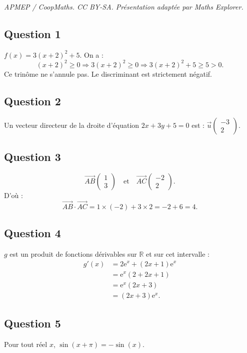 \documentclass[10pt]{article}
\providecommand{\e}{{\mathrm{e}}}
\begin{document}
\noindent\textit{APMEP / CoopMaths. CC BY-SA. Présentation adaptée par Maths Explorer.}\par\medskip
\subsection*{Question 1}

\(f(x) = 3(x + 2)^2 + 5\). On a :
\[
(x+2)^2 \geqslant 0 \Rightarrow 3(x+2)^2 \geqslant 0 \Rightarrow 3(x+2)^2 + 5 \geqslant 5 > 0.
\]
Ce trinôme ne s'annule pas. Le discriminant est strictement négatif.

\subsection*{Question 2}

Un vecteur directeur de la droite d'équation \(2x + 3y + 5 = 0\) est : \(\vec{u} \begin{pmatrix} -3 \\ 2 \end{pmatrix}\).

\subsection*{Question 3}

\[
\overrightarrow{AB} \begin{pmatrix} 1 \\ 3 \end{pmatrix} \quad \text{et} \quad \overrightarrow{AC} \begin{pmatrix} -2 \\ 2 \end{pmatrix}.
\]
D'où :
\[
\overrightarrow{AB} \cdot \overrightarrow{AC} = 1 \times (-2) + 3 \times 2 = -2 + 6 = 4.
\]

\subsection*{Question 4}

\(g\) est un produit de fonctions dérivables sur \(\mathbb{R}\) et sur cet intervalle :
\begin{align*}
g'(x) &= 2\e^x + (2x + 1)\e^x \\
&= \e^x(2 + 2x + 1) \\
&= \e^x(2x + 3) \\
&= (2x + 3)\e^x.
\end{align*}

\subsection*{Question 5}

Pour tout réel \(x\), \(\sin(x + \pi) = -\sin(x)\).
\end{document}
